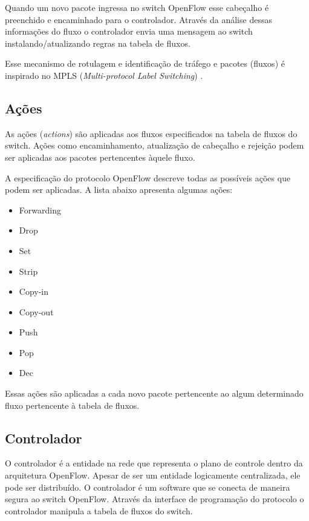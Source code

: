 Quando um novo pacote ingressa no switch OpenFlow esse cabeçalho é preenchido
e encaminhado para o controlador. 
Através da análise dessas informações do fluxo o controlador envia uma 
mensagem ao switch instalando/atualizando regras na tabela de fluxos. 

Esse mecanismo de rotulagem e identificação de tráfego e pacotes (fluxos) é
inspirado no MPLS (\emph{Multi-protocol Label Switching}) 
\citep{bruce2008mpls}.

\subsection{Ações}

As ações (\emph{actions}) são aplicadas aos fluxos especificados na tabela
de fluxos do switch.
Ações como encaminhamento, atualização de cabeçalho e rejeição podem ser 
aplicadas aos pacotes pertencentes àquele fluxo.

A especificação do protocolo OpenFlow \citep{ofprotocol2015} descreve todas 
as possíveis ações que podem ser aplicadas.
A lista abaixo apresenta algumas ações:

\begin{multicols}{3}
    \begin{itemize}
        \item Forwarding
        \item Drop
        \item Set
        \item Strip
        \item Copy-in
        \item Copy-out
        \item Push
        \item Pop
        \item Dec
    \end{itemize}
\end{multicols}

Essas ações são aplicadas a cada novo pacote pertencente ao algum determinado
fluxo pertencente à tabela de fluxos.

\subsection{Controlador}

O controlador é a entidade na rede que representa o plano de controle dentro
da arquitetura OpenFlow.
Apesar de ser um entidade logicamente centralizada, ele pode ser distribuído.
O controlador é um software que se conecta de maneira segura ao switch 
OpenFlow.
Através da interface de programação do protocolo o controlador manipula 
a tabela de fluxos do switch.

